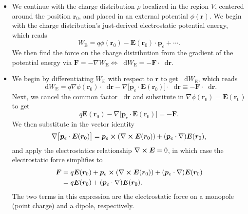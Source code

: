 \documentclass[11pt, a4paper]{article}
\newcommand{\diff}{\mathop{}\!\mathrm{d}} %
\renewcommand{\vec}[1]{\bm{#1}} %
\renewcommand{\r}{\vec{r}}
\newcommand{\E}{\vec{E}} %
\newcommand{\pe}{\vec{p}_{e}}  %
\renewcommand{\curl}{\nabla \cross}
\renewcommand{\grad}{\nabla}
\begin{document}
\begin{itemize}
    \item We continue with the charge distribution $ \rho $ localized in the region $ V $, centered around the position $ \r_{0} $, and placed in an external potential $ \phi(\r) $. We begin with the charge distribution's just-derived electrostatic potential energy, which reads
    \begin{equation*}
        W_{\text{E}} = q \phi(\r_{0}) - \E(\r_{0}) \cdot \pe + \cdots.
    \end{equation*}
    We then find the force on the charge distribution from the gradient of the potential energy via $ \vec{F} = - \grad W_{\text{E}} \iff \diff W_{\text{E}} = - \vec{F} \cdot \diff \r $. 


	\item We begin by differentiating $ W_{\text{E}} $ with respect to $ \r $ to get $ \diff W_{\text{E}} $, which reads
	\begin{equation*}
		\diff W_{\text{E}} = q \grad \phi(\r_{0}) \cdot \diff \r - \grad \big[\pe \cdot \E(\r_{0})\big] \cdot \diff \r \equiv - \vec{F} \cdot \diff \r.
	\end{equation*}
    Next, we cancel the common factor $ \diff \r $ and substitute in $ \grad \phi(\r_{0}) = \E(\r_{0}) $ to get
    \begin{equation*}
        q \E(\r_{0}) - \grad \big[\pe \cdot \E(\r_{0})\big] = - \vec{F}.
    \end{equation*}
    We then substitute in the vector identity 
	\begin{equation*}
		\grad\big[\pe \cdot \E(\r_{0})\big] = \pe \cross (\curl \E(\r_{0})) + (\pe \cdot \grad)\E(\r_{0}),
	\end{equation*}
    and apply the electrostatics relationship $ \curl \E = 0 $, in which case the electrostatic force simplifies to
    \begin{align*}
        \vec{F} &= q \E(\r_{0}) + \pe \cross (\curl \E(\r_{0})) + (\pe \cdot \grad)\E(\r_{0})\\
        & = q \E(\r_{0}) + (\pe \cdot \grad)\E(\r_{0}).
    \end{align*}
    The two terms in this expression are the electrostatic force on a monopole (point charge) and a dipole, respectively.
	
\end{itemize}
\end{document}
